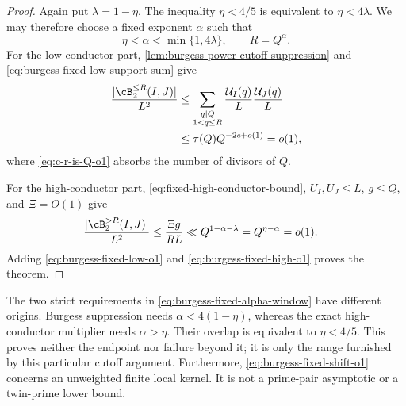 \begin{proof}
Again put $\lambda=1-\eta$.  The inequality $\eta<4/5$ is equivalent to
$\eta<4\lambda$.  We may therefore choose a fixed exponent $\alpha$ such
that
\begin{equation}\label{eq:burgess-fixed-alpha-window}
 \eta<\alpha<\min\{1,4\lambda\},
 \qquad R=Q^\alpha.
\end{equation}
For the low-conductor part,
\cref{lem:burgess-power-cutoff-suppression} and
\eqref{eq:burgess-fixed-low-support-sum} give
\begin{align}
 \frac{|\cB_2^{\le R}(I,J)|}{L^2}
 &\le
 \sum_{\substack{q\mid Q\\1<q\le R}}
 \frac{\mathcal U_I(q)}L\frac{\mathcal U_J(q)}L
 \notag\\
 &\le \tau(Q)Q^{-2c+o(1)}=o(1),
 \label{eq:burgess-fixed-low-o1}
\end{align}
where \eqref{eq:c-r-is-Q-o1} absorbs the number of divisors of $Q$.

For the high-conductor part, \eqref{eq:fixed-high-conductor-bound},
$U_I,U_J\le L$, $g\le Q$, and $\Xi=O(1)$ give
\begin{align}
 \frac{|\cB_2^{>R}(I,J)|}{L^2}
 &\le\frac{\Xi g}{RL}
 \ll Q^{1-\alpha-\lambda}
 =Q^{\eta-\alpha}=o(1).
 \label{eq:burgess-fixed-high-o1}
\end{align}
Adding \eqref{eq:burgess-fixed-low-o1} and
\eqref{eq:burgess-fixed-high-o1} proves the theorem.
\end{proof}

\begin{remark}
\label{rem:burgess-four-fifths-not-barrier}
The two strict requirements in \eqref{eq:burgess-fixed-alpha-window} have
different origins.  Burgess suppression needs $\alpha<4(1-\eta)$, whereas
the exact high-conductor multiplier needs $\alpha>\eta$.  Their overlap is
equivalent to $\eta<4/5$.  This proves neither the endpoint nor failure beyond
it; it is only the range furnished by this particular cutoff argument.
Furthermore, \eqref{eq:burgess-fixed-shift-o1} concerns an unweighted finite
local kernel.  It is not a prime-pair asymptotic or a twin-prime lower bound.
\end{remark}
